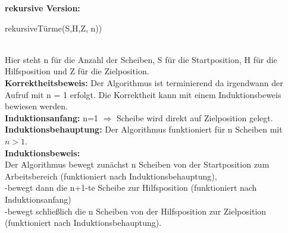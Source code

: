 \documentclass{article}
\begin{document}
\newpage
 \textbf{rekursive Version:}
\begin{algorithm}
    \NoCaptionOfAlgo
    \caption{rekursiveTürme(S,H,Z, n))}
\end{algorithm}\\
Hier steht n für die Anzahl der Scheiben, S für die Startposition, H für die Hilfsposition und Z für die Zielposition.\\
\textbf{Korrektheitsbeweis:} Der Algorithmus ist terminierend da irgendwann der Aufruf mit n = 1 erfolgt.
Die Korrektheit kann mit einem Induktionsbeweis bewiesen werden.\\
\textbf{Induktionsanfang:} n=1 $\Longrightarrow$ Scheibe wird direkt auf Zielposition gelegt.\\
\textbf{Induktionsbehauptung:} Der Algorithmus funktioniert für n Scheiben mit $n>1$.\\
\textbf{Induktionsbeweis:}\\ Der Algorithmus bewegt zunächst n Scheiben von
der Startposition zum Arbeitsbereich (funktioniert nach
Induktionsbehauptung),\\
-bewegt dann die n+1-te Scheibe zur Hilfsposition (funktioniert nach Induktionsanfang)\\
-bewegt schließlich die n Scheiben von
der Hilfsposition zur Zielposition (funktioniert nach Induktionsbehauptung).\\
\end{document}
